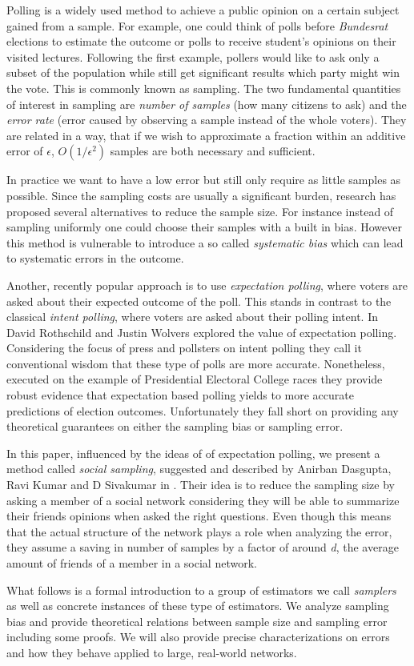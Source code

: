 Polling is a widely used method to achieve a public opinion on a certain subject gained from a sample. For example, one could think of polls before \textit{Bundesrat} elections to estimate the outcome or polls to receive student's opinions on their visited lectures.
Following the first example, pollers would like to ask only a subset of the population while still get significant results which party might win the vote. This is commonly known as sampling.
The two fundamental quantities of interest in sampling are \textit{number of samples} (how many citizens to ask) and the \textit{error rate} (error caused by observing a sample instead of the whole voters). They are related in a way, that if we wish to approximate a fraction within an additive error of $\epsilon$, $O(1/\epsilon^{2})$ samples are both necessary and sufficient.

In practice we want to have a low error but still only require as little samples as possible.
Since the sampling costs are usually a significant burden, research has proposed several alternatives to reduce the sample size.
For instance instead of sampling uniformly one could choose their samples with a built in bias.
However this method is vulnerable to introduce a so called \textit{systematic bias} which can lead to systematic errors in the outcome.

Another, recently popular approach is to use \textit{expectation polling}, where voters are asked about their expected outcome of the poll. This stands in contrast to the classical \textit{intent polling}, where voters are asked about their polling intent. In \cite{rothschild2009forecasting} David Rothschild and Justin Wolvers explored the value of expectation polling. Considering the focus of press and pollsters on intent polling they call it conventional wisdom that these type of polls are more accurate. Nonetheless, executed on the example of Presidential Electoral College races they provide robust evidence that expectation based polling yields to more accurate predictions of election outcomes.
Unfortunately they fall short on providing any theoretical guarantees on either the sampling bias or sampling error.

In this paper, influenced by the ideas of of expectation polling, we present a method called \textit{social sampling}, suggested and described by Anirban Dasgupta, Ravi Kumar and D Sivakumar in \cite{dasgupta2012social}.
Their idea is to reduce the sampling size by asking a member of a social network considering they will be able to summarize their friends opinions when asked the right questions.
Even though this means that the actual structure of the network plays a role when analyzing the error, they assume a saving in number of samples by a factor of around \textit{d}, the average amount of friends of a member in a social network.

What follows is a formal introduction to a group of estimators we call \textit{samplers} as well as concrete instances of these type of estimators. We analyze sampling bias and provide theoretical relations between sample size and sampling error including some proofs.
We will also provide precise characterizations on errors and how they behave applied to large, real-world networks.
